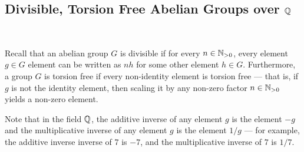 \subsection{Divisible, Torsion Free Abelian Groups over \texorpdfstring{$\mathbb{Q}$}{Q}}
~\label{sec:div-torsion-free-abelian-groups}

Recall that an abelian group $G$ is divisible if for every $n \in \mathbb{N}_{>0}$,
every element $g \in G$ element can be written as $nh$ for some other element $h \in G$.
Furthermore, a group $G$ is torsion free if every non-identity element is torsion free
--- that is, if $g$ is not the identity element, then scaling it by any non-zero
factor $n \in \mathbb{N}_{>0}$ yields a non-zero element.

Note that in the field $\mathbb{Q}$, the additive inverse of any element $g$
is the element $-g$ and the multiplicative inverse of any element $g$ is the element $1/g$
 --- for example, the additive inverse inverse of $7$ is $-7$,
and the multiplicative inverse of $7$ is $1/7$.

